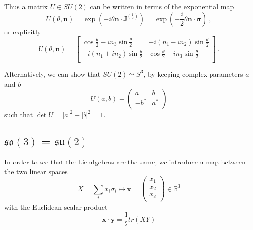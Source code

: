     Thus a matrix $U \in SU(2)$ can be written in terms of the exponential map 
    \begin{equation*}
        U(\theta, \mathbf n) = \exp(- i \theta \mathbf n \cdot \mathbf J^{(\frac{1}{2})}) = \exp(- \frac{i}{2} \theta \mathbf n \cdot \mathbf \sigma) ~,
    \end{equation*}
    or explicitly 
    \begin{equation*}
        U(\theta, \mathbf n) = \begin{bmatrix}
            \cos \frac{\theta}{2} - i n_3 \sin \frac{\theta}{2} & -i(n_1 - i n_2) \sin \frac{\theta}{2} \\ - i (n_1 + i n_2) \sin \frac{\theta}{2} & \cos \frac{\theta}{2} + i n_3 \sin \frac{\theta}{2} \\
        \end{bmatrix} ~.
    \end{equation*}

    Alternatively, we can show that $SU(2) \simeq S^3$, by keeping complex parameters $a$ and $b$
    \begin{equation}\label{su2mat}
        U(a, b) = \begin{pmatrix}
            a & b \\ -b^* & a^* \\
        \end{pmatrix}
    \end{equation}
    such that $\det U = |a|^2 + |b|^2 = 1$.

\subsection{$\mathfrak{so}(3)$ = $\mathfrak{su}(2)$}

    In order to see that the Lie algebras are the same, we introduce a map between the two linear spaces
    \begin{equation*}
        X = \sum_i x_i \sigma_i \mapsto \mathbf x = \begin{pmatrix}
            x_1 \\ x_2 \\ x_3 \\
        \end{pmatrix} \in \mathbb R^3
    \end{equation*}
    with the Euclidean scalar product 
    \begin{equation*}
        \mathbf x \cdot \mathbf y = \frac{1}{2} tr(XY)
    \end{equation*}

